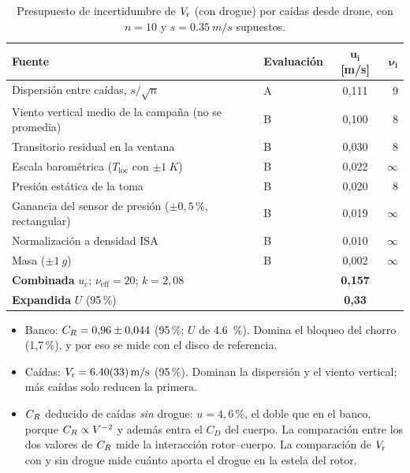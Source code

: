 \begin{table}[H]
\centering\small
\caption{Presupuesto de incertidumbre de $\Vr$ (con drogue) por caídas desde drone, con
$n=10$ y $s=\SI{0.35}{m/s}$ supuestos.}
\label{tab:ensayos-gumV}
\begin{tabular}{@{}llcr@{}}
\toprule
\textbf{Fuente} & \textbf{Evaluación} & $\boldsymbol{u_i}$ [m/s] & $\boldsymbol{\nu_i}$\\\midrule
Dispersión entre caídas, $s/\sqrt n$ & A & 0,111 & 9\\
Viento vertical medio de la campaña (no se promedia) & B & 0,100 & 8\\
Transitorio residual en la ventana & B & 0,030 & 8\\
Escala barométrica ($T_\text{loc}$ con $\pm\SI{1}{K}$) & B & 0,022 & $\infty$\\
Presión estática de la toma & B & 0,020 & 8\\
Ganancia del sensor de presión ($\pm0{,}5$\,\%, rectangular) & B & 0,019 & $\infty$\\
Normalización a densidad ISA & B & 0,010 & $\infty$\\
Masa ($\pm\SI{1}{g}$) & B & 0,002 & $\infty$\\\midrule
\textbf{Combinada} $u_c$; $\nu_\text{eff}=20$; $k=2{,}08$ & & \textbf{0,157} & \\
\textbf{Expandida} $U$ (95\,\%) & & \textbf{0,33} & \\
\bottomrule
\end{tabular}
\end{table}

\begin{resultado}
\begin{itemize}[leftmargin=*]
  \item Banco: $\CR=0{,}96\pm0{,}044$ (95\,\%; $U$ de \SI{4.6}{\percent}). Domina el bloqueo del chorro (1,7\,\%), y
        por eso se mide con el disco de referencia.
  \item Caídas: $\Vr=\SI{6.40 \pm 0.33}{m/s}$ (95\,\%). Dominan la dispersión y el viento
        vertical; más caídas solo reducen la primera.
  \item $\CR$ deducido de caídas \emph{sin} drogue: $u=4{,}6$\,\%, el doble que en el
        banco, porque $\CR\propto V^{-2}$ y además entra el $C_D$ del cuerpo. La
        comparación entre los dos valores de $\CR$ mide la interacción rotor--cuerpo.
        La comparación de $\Vr$ con y sin drogue mide cuánto aporta el drogue en la estela
        del rotor.
\end{itemize}
\end{resultado}

